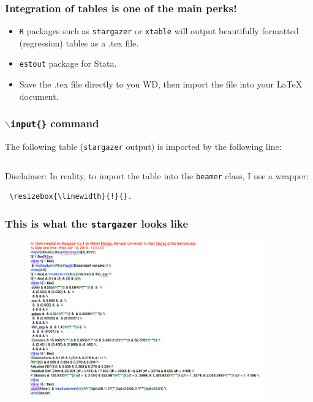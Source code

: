 \documentclass{beamer} %
\begin{document}
\begin{frame}[fragile=singleslide]
\frametitle{Integration of tables is one of the main perks!}
\begin{itemize}
\item \texttt{R} packages such as \texttt{stargazer} or \texttt{xtable} will output beautifully formatted (regression) tables as a .tex file. 
\item \texttt{estout} package for Stata.
\item Save the .tex file directly to you WD, then import the file into your {\LaTeX} document.
\end{itemize}
\end{frame}
 
\begin{frame}[fragile=singleslide]
\frametitle{\texttt{$\backslash$input\{\}} command}
The following table (\texttt{stargazer} output) is imported by the following line:
\begin{center}
\begin{verbatim}

\end{verbatim}
\end{center}
 
\begin{scriptsize}
Disclaimer: In reality, to import the table into the \texttt{beamer} class, I use a  wrapper: \begin{verbatim} \resizebox{\linewidth}{!}{}. \end{verbatim}
\end{scriptsize}
\end{frame}
 
 \begin{frame}
 \frametitle{This is what the \texttt{stargazer} looks like}
 \scriptsize
\begin{figure}[htbp]
\begin{center}
\includegraphics[width = 0.9\textwidth]{tab_simple.png}
\label{default}
\end{center}
\end{figure}
 \end{frame}
 
\end{document}
